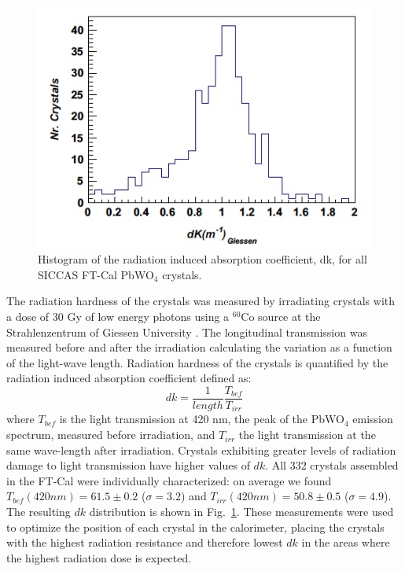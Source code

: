 \begin{figure}[th!]
\centering 
\includegraphics[width=0.85\columnwidth]{./fig/dk.jpeg} 
\caption{Histogram of the radiation induced absorption coefficient, dk, for all SICCAS FT-Cal
 PbWO$_4$ crystals.}
\label{fig:dk} 
\end{figure}
The radiation hardness of the crystals was measured  by irradiating crystals with a dose of 30 Gy of  low energy photons using a $^60$Co source at the Strahlenzentrum of Giessen University \cite{radhard}. The longitudinal transmission was measured before and after the irradiation calculating the variation as a function of the light-wave length. Radiation hardness of the crystals is quantified by the radiation induced absorption coefficient defined as:
\begin{equation}
dk = \frac{1}{length}\frac{T_{bef}}{T_{irr}}
\end{equation}
where $T_{bef}$ is the light transmission at 420 nm, the peak of the PbWO$_4$ emission spectrum, measured before irradiation, and $T_{irr}$ the light transmission at the same wave-length  after irradiation. 
Crystals exhibiting greater levels of radiation damage to light transmission have higher values of $dk$. 
All 332 crystals assembled in the FT-Cal were individually characterized: on average we found 
$T_{bef}(420 nm) = 61.5 \pm 0.2$ ($\sigma=3.2$) and 
$T_{irr}(420 nm) = 50.8 \pm 0.5$ ($\sigma=4.9$). 
The resulting $dk$ distribution is shown in Fig.~\ref{fig:dk}.
These measurements were used to optimize the position of each crystal in the calorimeter, placing the crystals with the highest radiation resistance and therefore lowest $dk$ in the areas where the highest radiation dose is expected.

